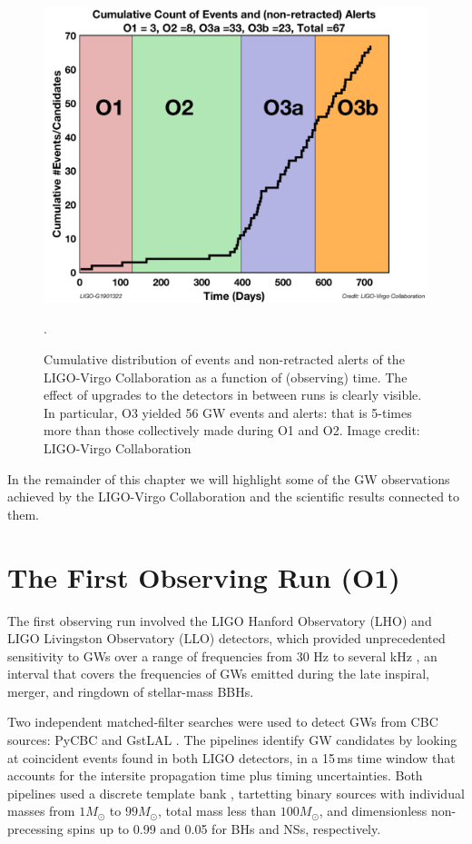 \documentclass[binding=0.6cm, LaM]{sapthesis}
\begin{document}
        \begin{figure}[!t]
          \label{o3detection}
          \includegraphics[scale=0.22]{o3detection}
          \centering
          \caption{Cumulative distribution of events and non-retracted alerts of the LIGO-Virgo Collaboration as a function of (observing) time.  The effect of upgrades to the detectors in between runs is clearly visible.  In particular, O3 yielded 56 GW events and alerts: that is 5-times more than those collectively made during O1 and O2. Image credit: LIGO-Virgo Collaboration}. 
          \label{fig:o3detection}
        \end{figure}

        In the remainder of this chapter we will highlight some of the GW observations achieved by the LIGO-Virgo Collaboration and the scientific results connected to them.

\section{The First Observing Run (O1)}

	The first observing run involved the LIGO Hanford Observatory (LHO) and LIGO Livingston Observatory (LLO) detectors, which provided unprecedented sensitivity to GWs
	over a range of frequencies from 30 Hz to several kHz \cite{14}, an interval that  
	covers the frequencies of GWs emitted during 
	the late inspiral, merger, and ringdown of stellar-mass BBHs.

	Two independent matched-filter searches were used to detect GWs from CBC sources: PyCBC \cite{109-112} and GstLAL \cite{112-114}.
	The pipelines identify GW candidates by looking at coincident events 
	found in both LIGO detectors, in a 15\,ms time window 
	that accounts for the intersite propagation time plus timing uncertainties. 
	Both pipelines used a discrete template bank \cite{42, 114, 115, 117-120}, tartetting binary sources with individual masses from $1{M_\odot}$ to $99{M_\odot}$,
	total mass less than $100{M_\odot}$, and dimensionless non-precessing spins up to 0.99 and 0.05 for BHs and NSs, respectively.
\end{document}
